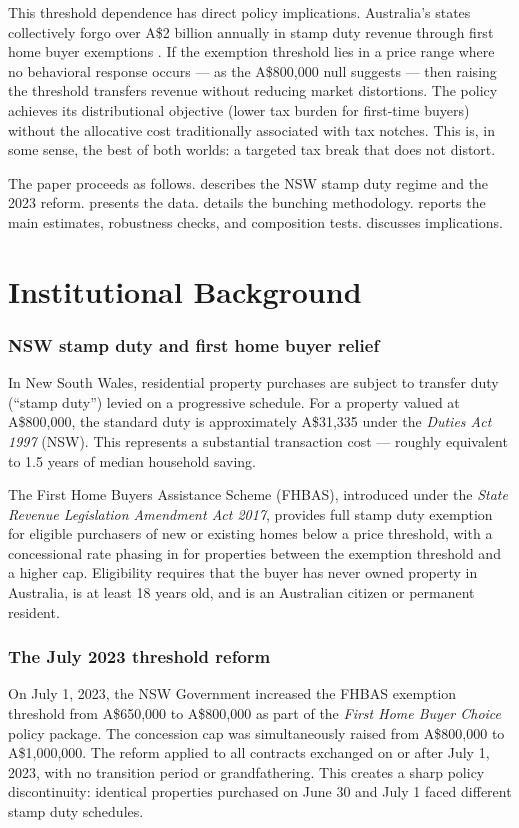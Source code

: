 \documentclass[12pt]{article}
\begin{document}
This threshold dependence has direct policy implications. Australia's states collectively forgo over A\$2 billion annually in stamp duty revenue through first home buyer exemptions \citep{treasury2023}. If the exemption threshold lies in a price range where no behavioral response occurs --- as the A\$800,000 null suggests --- then raising the threshold transfers revenue without reducing market distortions. The policy achieves its distributional objective (lower tax burden for first-time buyers) without the allocative cost traditionally associated with tax notches. This is, in some sense, the best of both worlds: a targeted tax break that does not distort.

The paper proceeds as follows.  describes the NSW stamp duty regime and the 2023 reform.  presents the data.  details the bunching methodology.  reports the main estimates, robustness checks, and composition tests.  discusses implications.

\section{Institutional Background}
\label{sec:background}

\subsubsection*{NSW stamp duty and first home buyer relief} In New South Wales, residential property purchases are subject to transfer duty (``stamp duty'') levied on a progressive schedule. For a property valued at A\$800,000, the standard duty is approximately A\$31,335 under the \textit{Duties Act 1997} (NSW). This represents a substantial transaction cost --- roughly equivalent to 1.5 years of median household saving.

The First Home Buyers Assistance Scheme (FHBAS), introduced under the \textit{State Revenue Legislation Amendment Act 2017}, provides full stamp duty exemption for eligible purchasers of new or existing homes below a price threshold, with a concessional rate phasing in for properties between the exemption threshold and a higher cap. Eligibility requires that the buyer has never owned property in Australia, is at least 18 years old, and is an Australian citizen or permanent resident.

\subsubsection*{The July 2023 threshold reform} On July 1, 2023, the NSW Government increased the FHBAS exemption threshold from A\$650,000 to A\$800,000 as part of the \textit{First Home Buyer Choice} policy package. The concession cap was simultaneously raised from A\$800,000 to A\$1,000,000. The reform applied to all contracts exchanged on or after July 1, 2023, with no transition period or grandfathering. This creates a sharp policy discontinuity: identical properties purchased on June 30 and July 1 faced different stamp duty schedules.
\end{document}
